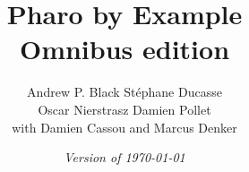 \documentclass[a4paper,10pt,twoside]{book}
\begin{document}
\frontmatter
\setcounter{page}{1}
\pagestyle{headings}
\author{
	Andrew P. Black\quad
	St\'ephane Ducasse\\[1ex]
	Oscar Nierstrasz\quad
	Damien Pollet
	\\[4ex]
	with Damien Cassou and Marcus Denker}
\title{\Huge\bf Pharo by Example\\ Omnibus edition}
\isodate
\date{\emph{Version of \today}}
\maketitle
~ %
\vfill
\end{document}
